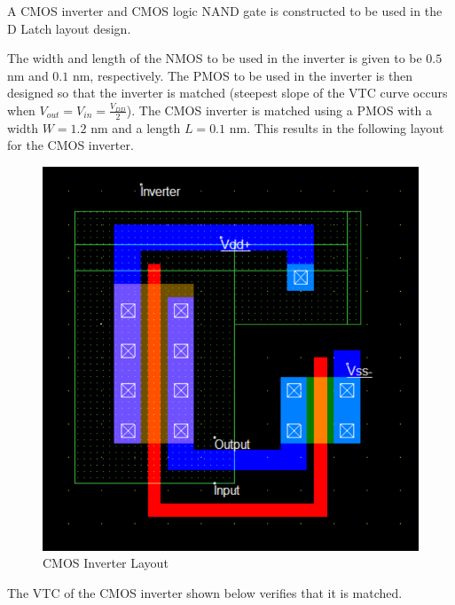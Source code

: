
A CMOS inverter and CMOS logic NAND gate is constructed to be used in the D Latch layout design.

The width and length of the NMOS to be used in the inverter is given to be $0.5$ \si{\nano\meter} and $0.1$ \si{\nano\meter}, respectively.
The PMOS to be used in the inverter is then designed so that the inverter is matched (steepest slope of the VTC curve occurs when $V_{out} = V_{in} = \frac{V_{DD}}{2}$).
The CMOS inverter is matched using a PMOS with a width $W = 1.2$ \si{\nano\meter} and a length $L = 0.1$ \si{\nano\meter}.
This results in the following layout for the CMOS inverter.

\FloatBarrier

\begin{figure}[h!]
	\centering
	\includegraphics[scale=0.40]{../images/inverter_layout.PNG}
	\caption{CMOS Inverter Layout}
	\label{fig:inverter_layout}
\end{figure}

\FloatBarrier

The VTC of the CMOS inverter shown below verifies that it is matched.

\FloatBarrier


